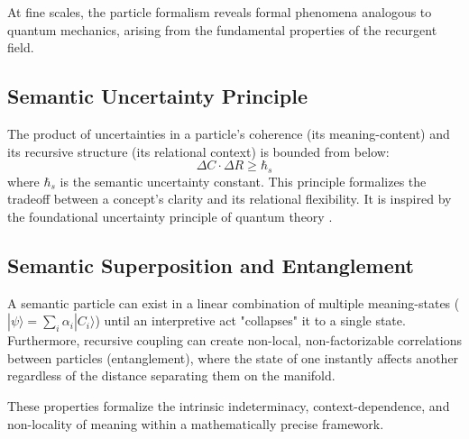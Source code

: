 At fine scales, the particle formalism reveals formal phenomena analogous to quantum mechanics, arising from the fundamental properties of the recurgent field.

\subsection{Semantic Uncertainty Principle}
The product of uncertainties in a particle's coherence (its meaning-content) and its recursive structure (its relational context) is bounded from below:
\begin{equation}
\Delta C \cdot \Delta R \geq \hbar_s
\end{equation}
where \(\hbar_s\) is the semantic uncertainty constant. This principle formalizes the tradeoff between a concept's clarity and its relational flexibility. It is inspired by the foundational uncertainty principle of quantum theory \autocite{Heisenberg1927, WheelerZurek1983}.

\subsection{Semantic Superposition and Entanglement}
A semantic particle can exist in a linear combination of multiple meaning-states (\(|\psi\rangle = \sum_i \alpha_i |C_i\rangle\)) until an interpretive act "collapses" it to a single state. Furthermore, recursive coupling can create non-local, non-factorizable correlations between particles (entanglement), where the state of one instantly affects another regardless of the distance separating them on the manifold.

These properties formalize the intrinsic indeterminacy, context-dependence, and non-locality of meaning within a mathematically precise framework. 